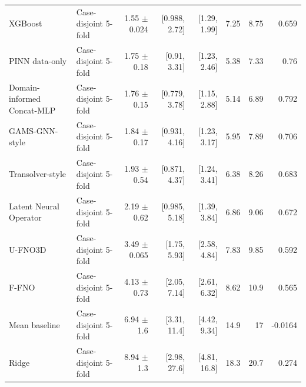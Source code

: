 \begin{landscape}
\begin{longtable}{p{3.8cm}p{2.9cm}rrrrrr}
XGBoost & Case-disjoint 5-fold & 1.55 $\pm$ 0.024 & [0.988, 2.72] & [1.29, 1.99] & 7.25 & 8.75 & 0.659 \\
PINN data-only & Case-disjoint 5-fold & 1.75 $\pm$ 0.18 & [0.91, 3.31] & [1.23, 2.46] & 5.38 & 7.33 & 0.76 \\
Domain-informed Concat-MLP & Case-disjoint 5-fold & 1.76 $\pm$ 0.15 & [0.779, 3.78] & [1.15, 2.88] & 5.14 & 6.89 & 0.792 \\
GAMS-GNN-style & Case-disjoint 5-fold & 1.84 $\pm$ 0.17 & [0.931, 4.16] & [1.23, 3.17] & 5.95 & 7.89 & 0.706 \\
Transolver-style & Case-disjoint 5-fold & 1.93 $\pm$ 0.54 & [0.871, 4.37] & [1.24, 3.41] & 6.38 & 8.26 & 0.683 \\
Latent Neural Operator & Case-disjoint 5-fold & 2.19 $\pm$ 0.62 & [0.985, 5.18] & [1.39, 3.84] & 6.86 & 9.06 & 0.672 \\
U-FNO3D & Case-disjoint 5-fold & 3.49 $\pm$ 0.065 & [1.75, 5.93] & [2.58, 4.84] & 7.83 & 9.85 & 0.592 \\
F-FNO & Case-disjoint 5-fold & 4.13 $\pm$ 0.73 & [2.05, 7.14] & [2.61, 6.32] & 8.62 & 10.9 & 0.565 \\
Mean baseline & Case-disjoint 5-fold & 6.94 $\pm$ 1.6 & [3.31, 11.4] & [4.42, 9.34] & 14.9 & 17 & -0.0164 \\
Ridge & Case-disjoint 5-fold & 8.94 $\pm$ 1.3 & [2.98, 27.6] & [4.81, 16.8] & 18.3 & 20.7 & 0.274 \\
\bottomrule\end{longtable}\end{landscape}

